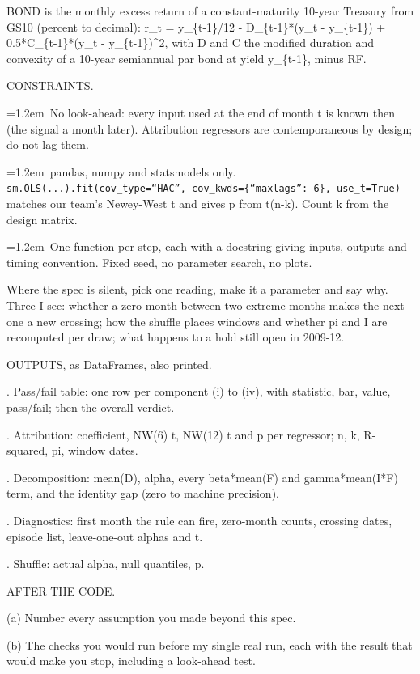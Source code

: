 \medskip
\par\noindent BOND is the monthly excess return of a constant-maturity 10-year Treasury from GS10 (percent to decimal): r\_t = y\_\{t-1\}/12 - D\_\{t-1\}*(y\_t - y\_\{t-1\}) + 0.5*C\_\{t-1\}*(y\_t - y\_\{t-1\})\^{}2, with D and C the modified duration and convexity of a 10-year semiannual par bond at yield y\_\{t-1\}, minus RF.
\medskip
\par\noindent CONSTRAINTS.
\par\hangindent=1.2em\noindent\textbullet~No look-ahead: every input used at the end of month t is known then (the signal a month later). Attribution regressors are contemporaneous by design; do not lag them.
\par\hangindent=1.2em\noindent\textbullet~pandas, numpy and statsmodels only. \texttt{sm.OLS(...).fit(cov\_type=``HAC'', cov\_kwds=\{``maxlags'': 6\}, use\_t=True)} matches our team's Newey-West t and gives p from t(n-k). Count k from the design matrix.
\par\hangindent=1.2em\noindent\textbullet~One function per step, each with a docstring giving inputs, outputs and timing convention. Fixed seed, no parameter search, no plots.
\medskip
\par\noindent Where the spec is silent, pick one reading, make it a parameter and say why. Three I see: whether a zero month between two extreme months makes the next one a new crossing; how the shuffle places windows and whether pi and I are recomputed per draw; what happens to a hold still open in 2009-12.
\medskip
\par\noindent OUTPUTS, as DataFrames, also printed.
\par{}. Pass/fail table: one row per component (i) to (iv), with statistic, bar, value, pass/fail; then the overall verdict.
\par{}. Attribution: coefficient, NW(6) t, NW(12) t and p per regressor; n, k, R-squared, pi, window dates.
\par{}. Decomposition: mean(D), alpha, every beta*mean(F) and gamma*mean(I*F) term, and the identity gap (zero to machine precision).
\par{}. Diagnostics: first month the rule can fire, zero-month counts, crossing dates, episode list, leave-one-out alphas and t.
\par{}. Shuffle: actual alpha, null quantiles, p.
\medskip
\par\noindent AFTER THE CODE.
\par\noindent (a) Number every assumption you made beyond this spec.
\par\noindent (b) The checks you would run before my single real run, each with the result that would make you stop, including a look-ahead test.
